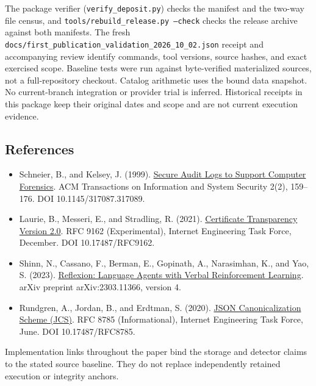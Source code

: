 \documentclass[
  11pt,
]{article}
\providecommand{\tightlist}{%
  \setlength{\itemsep}{0pt}\setlength{\parskip}{0pt}}
\begin{document}
The package verifier (\texttt{\nolinkurl{verify_deposit.py}})
checks the manifest and the two-way file census, and
\texttt{tools/rebuild\_release.py --check} checks the
release archive against both manifests. The fresh
\texttt{\nolinkurl{docs/first_publication_validation_2026_10_02.json}}
receipt and accompanying review identify commands, tool versions, source
hashes, and exact exercised scope. Baseline tests were run against
byte-verified materialized sources, not a full-repository checkout.
Catalog arithmetic uses the bound data snapshot. No current-branch
integration or provider trial is inferred. Historical receipts in this
package keep their original dates and scope and are not current
execution evidence.

\hypertarget{references}{%
\subsection{References}\label{references}}

\begin{itemize}
\tightlist
\item
  Schneier, B., and Kelsey, J. (1999).
  \href{https://www.schneier.com/academic/archives/1999/05/secure_audit_logs_to.html}{Secure
  Audit Logs to Support Computer Forensics}. ACM Transactions on
  Information and System Security 2(2), 159--176. DOI
  10.1145/317087.317089.
\item
  Laurie, B., Messeri, E., and Stradling, R. (2021).
  \href{https://www.rfc-editor.org/rfc/rfc9162.html}{Certificate
  Transparency Version 2.0}. RFC 9162 (Experimental), Internet
  Engineering Task Force, December. DOI 10.17487/RFC9162.
\item
  Shinn, N., Cassano, F., Berman, E., Gopinath, A., Narasimhan, K., and
  Yao, S. (2023). \href{https://arxiv.org/abs/2303.11366v4}{Reflexion:
  Language Agents with Verbal Reinforcement Learning}. arXiv preprint
  arXiv:2303.11366, version 4.
\item
  Rundgren, A., Jordan, B., and Erdtman, S. (2020).
  \href{https://www.rfc-editor.org/rfc/rfc8785.html}{JSON
  Canonicalization Scheme (JCS)}. RFC 8785 (Informational), Internet
  Engineering Task Force, June. DOI 10.17487/RFC8785.
\end{itemize}

Implementation links throughout the paper bind the storage and detector
claims to the stated source baseline. They do not replace independently
retained execution or integrity anchors.
\end{document}
